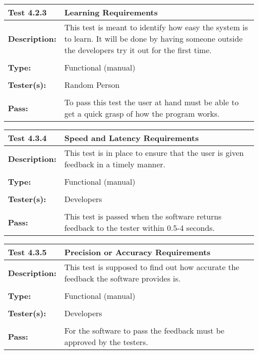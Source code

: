 \documentclass{article}
\begin{document}
\begin{tabularx}{\textwidth}{p{2cm}p{9cm}}
\toprule 
{\bf Test 4.2.3} & {\bf Learning Requirements}\\
\midrule
\textbf{Description:} & This test is meant to identify how easy the system is to learn. It will be done by having someone outside the developers try it out for the first time.\\[0.3\baselineskip]
                      &                     \\
\textbf{Type:} & Functional (manual)   \\[0.3\baselineskip]
                      &                     \\
\textbf{Tester(s):} & Random Person \\[0.3\baselineskip]
                      &                     \\
\textbf{Pass:} & To pass this test the user at hand must be able to get a quick grasp of how the program works. \\[0.3\baselineskip]
\end{tabularx}

\begin{tabularx}{\textwidth}{p{2cm}p{9cm}}
\toprule 
{\bf Test 4.3.4} & {\bf Speed and Latency Requirements}\\
\midrule
\textbf{Description:} & This test is in place to ensure that the user is given feedback in a timely manner. \\[0.3\baselineskip]
                      &                     \\
\textbf{Type:} & Functional (manual)   \\[0.3\baselineskip]
                      &                     \\
\textbf{Tester(s):} & Developers \\[0.3\baselineskip]
                      &                     \\
\textbf{Pass:} & This test is passed when the software returns feedback to the tester within 0.5-4 seconds. \\[0.3\baselineskip]
\end{tabularx}

\begin{tabularx}{\textwidth}{p{2cm}p{9cm}}
\toprule 
{\bf Test 4.3.5} & {\bf Precision or Accuracy Requirements}\\
\midrule
\textbf{Description:} & This test is supposed to find out how accurate the feedback the software provides is. \\[0.3\baselineskip]
                      &                     \\
\textbf{Type:} & Functional (manual)   \\[0.3\baselineskip]
                      &                     \\
\textbf{Tester(s):} & Developers \\[0.3\baselineskip]
                      &                     \\
\textbf{Pass:} & For the software to pass the feedback must be approved by the testers. \\[0.3\baselineskip]
\bottomrule
\end{tabularx}
\end{document}
